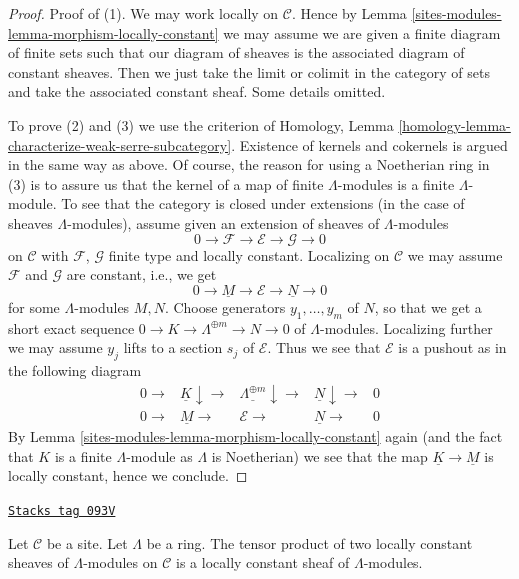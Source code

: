 \begin{proof}
Proof of (1). We may work locally on $\mathcal{C}$. Hence by
Lemma \ref{sites-modules-lemma-morphism-locally-constant} we may assume
we are given a finite diagram of
finite sets such that our diagram of sheaves is the associated
diagram of constant sheaves. Then we just take the limit or colimit
in the category of sets and take the associated constant sheaf.
Some details omitted.

\medskip\noindent
To prove (2) and (3) we use the criterion of
Homology, Lemma \ref{homology-lemma-characterize-weak-serre-subcategory}.
Existence of kernels and cokernels is argued in the same way
as above. Of course, the reason for using
a Noetherian ring in (3) is to assure us that the kernel of a map
of finite $\Lambda$-modules is a finite $\Lambda$-module.
To see that the category is closed under extensions
(in the case of sheaves $\Lambda$-modules), assume given
an extension of sheaves of $\Lambda$-modules
$$
0 \to \mathcal{F} \to \mathcal{E} \to \mathcal{G} \to 0
$$
on $\mathcal{C}$ with $\mathcal{F}$, $\mathcal{G}$
finite type and locally constant. Localizing on $\mathcal{C}$
we may assume $\mathcal{F}$ and $\mathcal{G}$ are constant, i.e., we
get
$$
0 \to \underline{M} \to \mathcal{E} \to \underline{N} \to 0
$$
for some $\Lambda$-modules $M, N$. Choose generators $y_1, \ldots, y_m$
of $N$, so that we get a short exact sequence
$0 \to K \to \Lambda^{\oplus m} \to N \to 0$ of $\Lambda$-modules.
Localizing further we may assume $y_j$ lifts to a section
$s_j$ of $\mathcal{E}$. Thus we see that $\mathcal{E}$ is a
pushout as in the following diagram
$$
\begin{array}{ccccc}0 \longrightarrow & \underline{K} \downarrow\longrightarrow & \underline{\Lambda^{\oplus m}} \downarrow\longrightarrow & \underline{N} \downarrow\longrightarrow & 0 \\ 0 \longrightarrow & \underline{M} \longrightarrow & \mathcal{E} \longrightarrow & \underline{N} \longrightarrow & 0\end{array}
$$
By Lemma \ref{sites-modules-lemma-morphism-locally-constant} again (and the fact that
$K$ is a finite $\Lambda$-module as $\Lambda$ is Noetherian) we see that
the map $\underline{K} \to \underline{M}$ is locally constant, hence
we conclude.
\end{proof}

\begin{lemma}
\label{sites-modules-lemma-tensor-product-locally-constant}
\href{https://stacks.math.columbia.edu/tag/093V}{\texttt{Stacks tag 093V}}

Let $\mathcal{C}$ be a site. Let $\Lambda$ be a ring.
The tensor product of two locally constant sheaves of $\Lambda$-modules
on $\mathcal{C}$ is a locally constant sheaf of $\Lambda$-modules.
\end{lemma}

